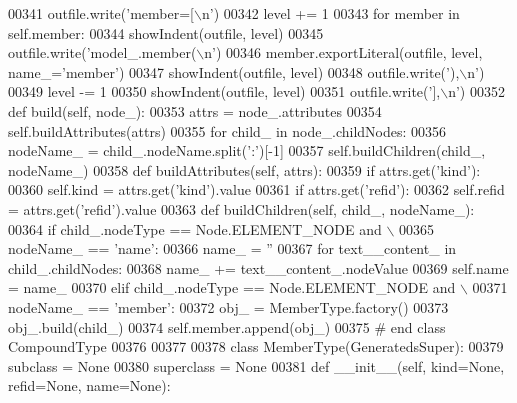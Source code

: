\begin{DoxyCode}
{{{{{{{{{{{{{{{{{{{{{{{{{{{{{{{{00341         outfile.write(\textcolor{stringliteral}{'member=[\(\backslash\)n'})
00342         level += 1
00343         \textcolor{keywordflow}{for} member \textcolor{keywordflow}{in} self.member:
00344             showIndent(outfile, level)
00345             outfile.write(\textcolor{stringliteral}{'model\_.member(\(\backslash\)n'})
00346             member.exportLiteral(outfile, level, name\_=\textcolor{stringliteral}{'member'})
00347             showIndent(outfile, level)
00348             outfile.write(\textcolor{stringliteral}{'),\(\backslash\)n'})
00349         level -= 1
00350         showIndent(outfile, level)
00351         outfile.write(\textcolor{stringliteral}{'],\(\backslash\)n'})
00352     \textcolor{keyword}{def }build(self, node\_):
00353         attrs = node\_.attributes
00354         self.buildAttributes(attrs)
00355         \textcolor{keywordflow}{for} child\_ \textcolor{keywordflow}{in} node\_.childNodes:
00356             nodeName\_ = child\_.nodeName.split(\textcolor{stringliteral}{':'})[-1]
00357             self.buildChildren(child\_, nodeName\_)
00358     \textcolor{keyword}{def }buildAttributes(self, attrs):
00359         \textcolor{keywordflow}{if} attrs.get(\textcolor{stringliteral}{'kind'}):
00360             self.kind = attrs.get(\textcolor{stringliteral}{'kind'}).value
00361         \textcolor{keywordflow}{if} attrs.get(\textcolor{stringliteral}{'refid'}):
00362             self.refid = attrs.get(\textcolor{stringliteral}{'refid'}).value
00363     \textcolor{keyword}{def }buildChildren(self, child\_, nodeName\_):
00364         \textcolor{keywordflow}{if} child\_.nodeType == Node.ELEMENT\_NODE \textcolor{keywordflow}{and} \(\backslash\)
00365             nodeName\_ == \textcolor{stringliteral}{'name'}:
00366             name\_ = \textcolor{stringliteral}{''}
00367             \textcolor{keywordflow}{for} text\_\_content\_ \textcolor{keywordflow}{in} child\_.childNodes:
00368                 name\_ += text\_\_content\_.nodeValue
00369             self.name = name\_
00370         \textcolor{keywordflow}{elif} child\_.nodeType == Node.ELEMENT\_NODE \textcolor{keywordflow}{and} \(\backslash\)
00371             nodeName\_ == \textcolor{stringliteral}{'member'}:
00372             obj\_ = MemberType.factory()
00373             obj\_.build(child\_)
00374             self.member.append(obj\_)
00375 \textcolor{comment}{# end class CompoundType}
00376 
00377 
00378 \textcolor{keyword}{class }MemberType(GeneratedsSuper):
00379     subclass = \textcolor{keywordtype}{None}
00380     superclass = \textcolor{keywordtype}{None}
00381     \textcolor{keyword}{def }__init__(self, kind=None, refid=None, name=None):
}}}}}}}}}}}}}}}}}}}}}}}}}}}}}}}}
\end{DoxyCode}
